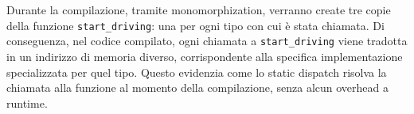 Durante la compilazione, tramite monomorphization, verranno create tre copie della funzione \texttt{start\_driving}: una per ogni tipo con cui è stata chiamata. Di conseguenza, nel codice compilato, ogni chiamata a \texttt{start\_driving} viene tradotta in un indirizzo di memoria diverso, corrispondente alla specifica implementazione specializzata per quel tipo. Questo evidenzia come lo static dispatch risolva la chiamata alla funzione al momento della compilazione, senza alcun overhead a runtime.


